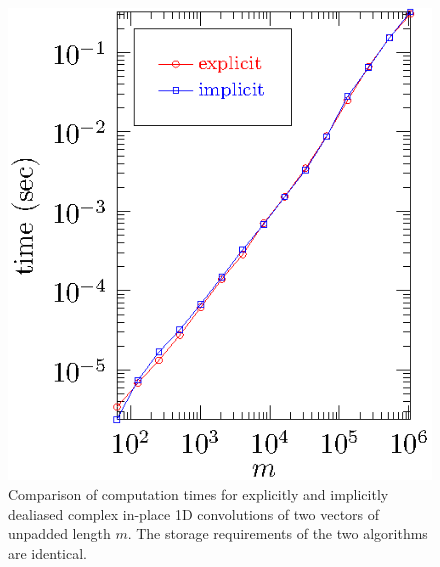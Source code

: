 \documentclass[final]{siamltex}
\begin{document}
\begin{figure}[htbp]
\begin{minipage}{0.49\linewidth}
\begin{center}
\includegraphics{timing1c}
\caption{Comparison of computation times for explicitly and implicitly
dealiased complex in-place 1D convolutions of two vectors of
unpadded length $m$. The storage requirements of the two algorithms are
identical.}
\label{timing1c}
\end{center}
\end{minipage}
\begin{minipage}{0.49\linewidth}
\begin{center}

\end{center}
\end{minipage}
\end{figure}
\end{document}
